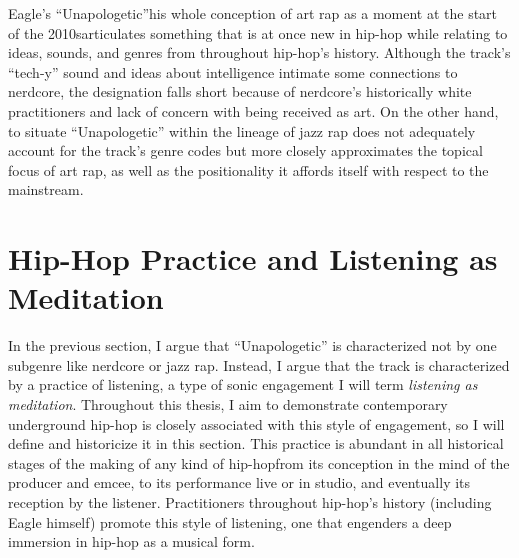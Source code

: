 Eagle's ``Unapologetic''\textemdash his whole conception of art rap as a moment at the start of the 
2010s\textemdash articulates something that is at once new in hip-hop while relating to ideas, sounds, and 
genres from throughout hip-hop's history. Although the track's ``tech-y'' sound and ideas about intelligence
intimate some connections to nerdcore, the designation falls short because of nerdcore's historically white
practitioners and lack of concern with being received as art. On the other hand, to situate ``Unapologetic''
within the lineage of jazz rap does not adequately account for the track's genre codes but more closely
approximates the topical focus of art rap, as well as the positionality it affords itself with respect
to the mainstream.

\section{Hip-Hop Practice and Listening as Meditation} \label{listeningasmeditation}

In the previous section, I argue that ``Unapologetic'' is characterized not by one subgenre like
nerdcore or jazz rap. Instead, I argue that the track is characterized by a practice of listening,
a type of sonic engagement I will term \emph{listening as meditation}. Throughout this thesis, I aim
to demonstrate contemporary underground hip-hop is closely associated with this style of engagement,
so I will define and historicize it in this section. This practice is abundant in all historical 
stages of the making of any kind of hip-hop\textemdash from its conception in the mind of the producer
and emcee, to its performance live or in studio, and eventually its reception by the listener. 
Practitioners throughout hip-hop's history (including Eagle himself) promote this style of listening,
one that engenders a deep immersion in hip-hop as a musical form.

